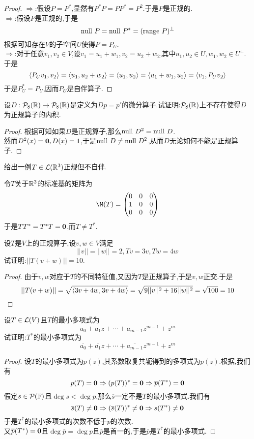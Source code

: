 \documentclass{ctexart}
\begin{document}
\begin{proof}
    $\Rightarrow$:假设$P=P^*$,显然有$P^*P=PP^*=P^2$.于是$P$是正规的.\\
    $\Rightarrow$:假设$P$是正规的,于是
    \[\text{null } P=\text{null } P^*=(\text{range } P)^\bot\]
    根据可知存在$V$的子空间$U$使得$P=P_U$.\\
    $\Rightarrow$:对于任意$v_1,v_2\in V$,设$v_1=u_1+w_1,v_2=u_2+w_2$,其中$u_1,u_2\in U,w_1,w_2\in U^\bot$.于是
    \[\left\langle{P_Uv_1},{v_2}\right\rangle=\left\langle{u_1},{u_2+w_2}\right\rangle=\left\langle{u_1},{u_2}\right\rangle=\left\langle{u_1+w_1},{u_2}\right\rangle=\left\langle{v_1},{P_Uv_2}\right\rangle\]
    于是$P_U^*=P_U$,因而$P_U$是自伴算子.
\end{proof}
\begin{problem}[21.]
    设$D:\mathcal{P}_8(\mathbb{R})\to\mathcal{P}_8(\mathbb{R})$是定义为$Dp=p'$的微分算子.试证明:$\mathcal{P}_8(\mathbb{R})$上不存在使得$D$为正规算子的内积.
\end{problem}
\begin{proof}
    根据可知如果$D$是正规算子,那么$\text{null } D^2=\text{null } D$.\\
    然而$D^2(x)=\mathbf0,D(x)=1$,于是$\text{null } D\neq\text{null } D^2$,从而$D$无论如何不能是正规算子.
\end{proof}
\begin{problem}[22.]
    给出一例$T\in\mathcal{L}(\mathbb{R}^3)$正规但不自伴.
\end{problem}
\begin{solution}
    令$T$关于$\mathbb{R}^3$的标准基的矩阵为
    \[\M(T)=\begin{pmatrix}
        0&0&0\\1&0&0\\0&0&0
    \end{pmatrix}\]
    于是$TT^*=T^*T=\mathbf0$,而$T\neq T^*$.
\end{solution}
\begin{problem}[23.]
    设$T$是$V$上的正规算子,设$v,w\in V$满足
    \[||v||=||w||=2,Tv=3v,Tw=4w\]
    试证明:$||T(v+w)||=10$.
\end{problem}
\begin{proof}
    由于$v,w$对应于$T$的不同特征值,又因为$T$是正规算子,于是$v,w$正交.于是
    \[||T(v+w)||=\sqrt{\left\langle{3v+4w},{3v+4w}\right\rangle}=\sqrt{9||v||^2+16||w||^2}=\sqrt{100}=10\]
\end{proof}
\begin{problem}[24.]
    设$T\in\mathcal{L}(V)$且$T$的最小多项式为
    \[a_0+a_1z+\cdots+a_{m-1}z^{m-1}+z^m\]
    试证明:$T^*$的最小多项式为
    \[\overline{a_0}+\overline{a_1}z+\cdots+\overline{a_{m-1}}z^{m-1}+z^m\]
\end{problem}
\begin{proof}
    设$T$的最小多项式为$p(z)$,其系数取复共轭得到的多项式为$\overline{p}(z)$.根据,我们有
    \[p(T)=\mathbf0\Rightarrow(p(T))^*=\mathbf0\Rightarrow\overline{p}(T^*)=\mathbf0\]
    假定$s\in\mathcal{P}(\mathbb{F})$且$\deg s<\deg p$,那么$\overline{s}$一定不是$T$的最小多项式.我们有
    \[\overline{s}(T)\neq\mathbf0\Rightarrow(\overline{s}(T))^*\neq\mathbf0\Rightarrow s(T^*)\neq\mathbf0\]
    于是$T^*$的最小多项式的次数不低于$p$的次数.\\
    又$\overline{p}(T^*)=\mathbf0$且$\deg\overline{p}=\deg p$且$\overline{p}$是首一的,于是$\overline{p}$是$T^*$的最小多项式.
\end{proof}
\end{document}
